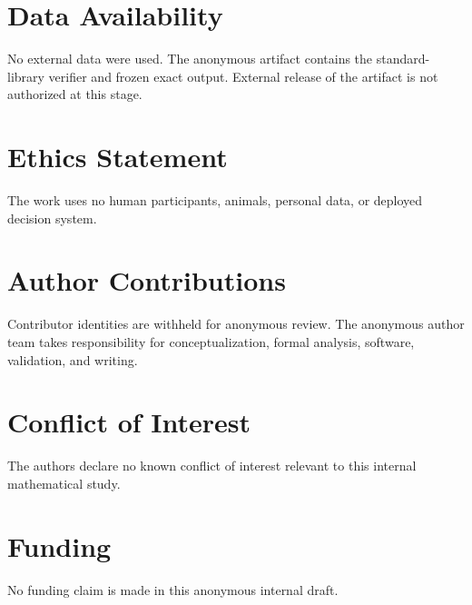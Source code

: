 \documentclass[a4paper,10pt]{amsart}
\theoremstyle{definition}
\theoremstyle{remark}
\begin{document}
\section*{Data Availability}
No external data were used.  The anonymous artifact contains the
standard-library verifier and frozen exact output.  External release of the
artifact is not authorized at this stage.

\section*{Ethics Statement}
The work uses no human participants, animals, personal data, or deployed
decision system.

\section*{Author Contributions}
Contributor identities are withheld for anonymous review.  The anonymous
author team takes responsibility for conceptualization, formal analysis,
software, validation, and writing.

\section*{Conflict of Interest}
The authors declare no known conflict of interest relevant to this internal
mathematical study.

\section*{Funding}
No funding claim is made in this anonymous internal draft.



\end{document}
